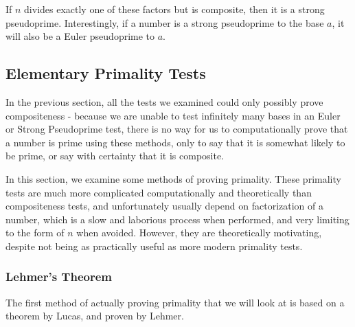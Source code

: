 \documentclass{article}
\begin{document}
\par If $n$ divides exactly one of these factors but is composite, then it is a strong pseudoprime. Interestingly, if a number is
a strong pseudoprime to the base $a$, it will also be a Euler pseudoprime to $a$.








\subsection*{Elementary Primality Tests}

\par In the previous section, all the tests we examined could only possibly prove compositeness - because we are unable to test infinitely many bases in an Euler or Strong Pseudoprime test, there is no way for us to computationally prove that a number is prime using these methods, only to say that it is somewhat likely to be prime, or say with certainty that it is composite. 
\par In this section, we examine some methods of proving primality. These primality tests are much more complicated computationally and theoretically than compositeness tests, and unfortunately usually depend on factorization of a number, which is a slow and laborious process when performed, and very limiting to the form of $n$ when avoided. However, they are theoretically motivating, despite not being as practically useful as more modern primality tests.

\subsubsection*{Lehmer's Theorem}

\par The first method of actually proving primality that we will look at is based on a theorem by Lucas, and proven by Lehmer.
\end{document}
